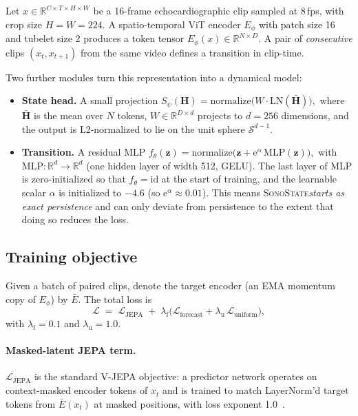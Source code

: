 \documentclass[runningheads]{llncs}
\newcommand{\sonostate}{\textsc{SonoState}\xspace}
\begin{document}
Let $x \in \mathbb{R}^{C \times T \times H \times W}$ be a 16-frame
echocardiographic clip sampled at 8\,fps, with crop size $H{=}W{=}224$.
A spatio-temporal ViT encoder $E_\phi$ with patch size 16 and tubelet size
2 produces a token tensor $E_\phi(x) \in \mathbb{R}^{N \times D}$. A pair of
\emph{consecutive} clips $(x_t, x_{t+1})$ from the same video defines a
transition in clip-time.

Two further modules turn this representation into a dynamical model:

\begin{itemize}
\item \textbf{State head.} A small projection
\(
S_\psi(\mathbf{H}) = \mathrm{normalize}\bigl(W \cdot \mathrm{LN}(\bar{\mathbf{H}})\bigr),
\)
where $\bar{\mathbf{H}}$ is the mean over $N$ tokens, $W \in \mathbb{R}^{D \times d}$
projects to $d{=}256$ dimensions, and the output is L2-normalized to lie on the
unit sphere $\mathcal{S}^{d-1}$.

\item \textbf{Transition.} A residual MLP
\(
f_\theta(\mathbf{z}) = \mathrm{normalize}\bigl(\mathbf{z}
+ \mathrm{e}^{\alpha}\,\mathrm{MLP}(\mathbf{z})\bigr),
\)
with $\mathrm{MLP}: \mathbb{R}^{d}\!\to\!\mathbb{R}^{d}$ (one hidden layer of
width 512, GELU). The last layer of MLP is zero-initialized so that
$f_\theta = \mathrm{id}$ at the start of training, and the learnable scalar
$\alpha$ is initialized to $-4.6$ (so $\mathrm{e}^{\alpha}\!\approx\!0.01$).
This means \sonostate \emph{starts as exact persistence} and can only deviate
from persistence to the extent that doing so reduces the loss.
\end{itemize}

\subsection{Training objective}

Given a batch of paired clips, denote the target encoder (an EMA momentum
copy of $E_\phi$) by $\bar E$. The total loss is
\begin{equation}
\mathcal{L} \;=\; \mathcal{L}_{\mathrm{JEPA}}
\;+\; \lambda_{\mathrm{f}}\bigl(\mathcal{L}_{\mathrm{forecast}}
+ \lambda_{\mathrm{u}}\,\mathcal{L}_{\mathrm{uniform}}\bigr),
\label{eq:loss}
\end{equation}
with $\lambda_{\mathrm{f}}{=}0.1$ and $\lambda_{\mathrm{u}}{=}1.0$.

\paragraph{Masked-latent JEPA term.}
$\mathcal{L}_{\mathrm{JEPA}}$ is the standard V-JEPA objective: a predictor
network operates on context-masked encoder tokens of $x_t$ and is trained to
match LayerNorm'd target tokens from $\bar E(x_t)$ at masked positions, with
loss exponent 1.0~\cite{vjepa2}.
\end{document}
